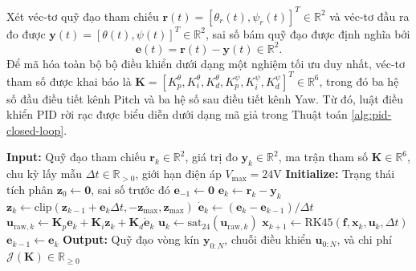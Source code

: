 \documentclass[conference, a4paper]{IEEEtran}
\begin{document}
Xét véc-tơ quỹ đạo tham chiếu $\mathbf{r}(t) = [\theta_{r}(t), \psi_{r}(t)]^T \in \mathbb{R}^{2}$ và véc-tơ đầu ra đo được $\mathbf{y}(t) = [\theta(t), \psi(t)]^T \in \mathbb{R}^{2}$, sai số bám quỹ đạo được định nghĩa bởi
\begin{equation}
\mathbf{e}(t) = \mathbf{r}(t) - \mathbf{y}(t) \in \mathbb{R}^{2}.
\end{equation}
Để mã hóa toàn bộ bộ điều khiển dưới dạng một nghiệm tối ưu duy nhất, véc-tơ tham số được khai báo là $\boldsymbol{K} = [K_{p}^{\theta}, K_{i}^{\theta}, K_{d}^{\theta}, K_{p}^{\psi}, K_{i}^{\psi}, K_{d}^{\psi}]^T \in \mathbb{R}^{6}$, trong đó ba hệ số đầu điều tiết kênh Pitch và ba hệ số sau điều tiết kênh Yaw. Từ đó, luật điều khiển PID rời rạc được biểu diễn dưới dạng mã giả trong Thuật toán \ref{alg:pid-closed-loop}.

\begin{algorithm}[!t]
\small
\begin{algorithmic}[1]
\STATE \textbf{Input:} Quỹ đạo tham chiếu $\mathbf{r}_k \in \mathbb{R}^2$, giá trị đo $\mathbf{y}_k \in \mathbb{R}^2$, ma trận tham số $\boldsymbol{K} \in \mathbb{R}^6$, chu kỳ lấy mẫu $\Delta t \in \mathbb{R}_{>0}$, giới hạn điện áp $V_{\max} = 24\mathrm{V}$
\STATE \textbf{Initialize:} Trạng thái tích phân $\mathbf{z}_0 \leftarrow \mathbf{0}$, sai số trước đó $\mathbf{e}_{-1} \leftarrow \mathbf{0}$
    \STATE $\mathbf{e}_k \leftarrow \mathbf{r}_k - \mathbf{y}_k$
    \STATE $\mathbf{z}_k \leftarrow \mathrm{clip}(\mathbf{z}_{k-1} + \mathbf{e}_k \Delta t, -\mathbf{z}_{\max}, \mathbf{z}_{\max})$
    \STATE $\dot{\mathbf{e}}_k \leftarrow (\mathbf{e}_k - \mathbf{e}_{k-1}) / \Delta t$
    \STATE $\mathbf{u}_{\mathrm{raw},k} \leftarrow \mathbf{K}_p\mathbf{e}_k + \mathbf{K}_i\mathbf{z}_k + \mathbf{K}_d\dot{\mathbf{e}}_k$
    \STATE $\mathbf{u}_k \leftarrow \mathrm{sat}_{24}(\mathbf{u}_{\mathrm{raw},k})$
    \STATE $\mathbf{x}_{k+1} \leftarrow \text{RK45}(\mathbf{f}, \mathbf{x}_k, \mathbf{u}_k, \Delta t)$
    \STATE $\mathbf{e}_{k-1} \leftarrow \mathbf{e}_k$
\ENDFOR
\STATE \textbf{Output:} Quỹ đạo vòng kín $\mathbf{y}_{0:N}$, chuỗi điều khiển $\mathbf{u}_{0:N}$, và chi phí $\mathcal{J}(\boldsymbol{K}) \in \mathbb{R}_{\ge 0}$
\end{algorithmic}
\caption{Mã giả vòng điều khiển PID phân tán cho Quanser 2DOF Helicopter. Hệ thống thực thi tích phân số học RK45 qua từng chu kỳ lấy mẫu $\Delta t$, đồng thời áp dụng cơ chế bão hòa điện áp $\mathrm{sat}_{24}(\cdot)$ trước khi cấp cho cơ cấu chấp hành.}
\label{alg:pid-closed-loop}
\end{algorithm}
\end{document}
